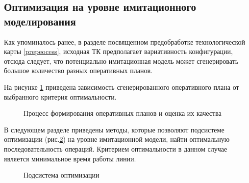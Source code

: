 \subsection{Оптимизация на уровне имитационного моделирования}

Как упоминалось ранее, в разделе посвященном предобработке технологической карты \ref{prepeocess}, исходная ТК предполагает вариативность конфигурации, отсюда следует, что потенциально имитационная модель может сгенерировать большое количество разных оперативных планов.

На рисунке \ref{ris:IM_process} приведена зависимость сгенерированного оперативного плана от выбранного критерия оптимальности.




\begin{figure}[H]
    \caption{Процесс формирования оперативных планов и оценка их качества}
    \label{ris:IM_process}
\end{figure}

В следующем разделе приведены методы, которые позволяют подсистеме оптимизации (рис.\ref{ris:optimization}) на уровне имитационной модели, найти оптимальную последовательность операций. Критерием оптимальности в данном случае является минимальное время работы линии.

\begin{figure}[H]
    \caption{Подсистема оптимизации}
    \label{ris:optimization}
\end{figure}


